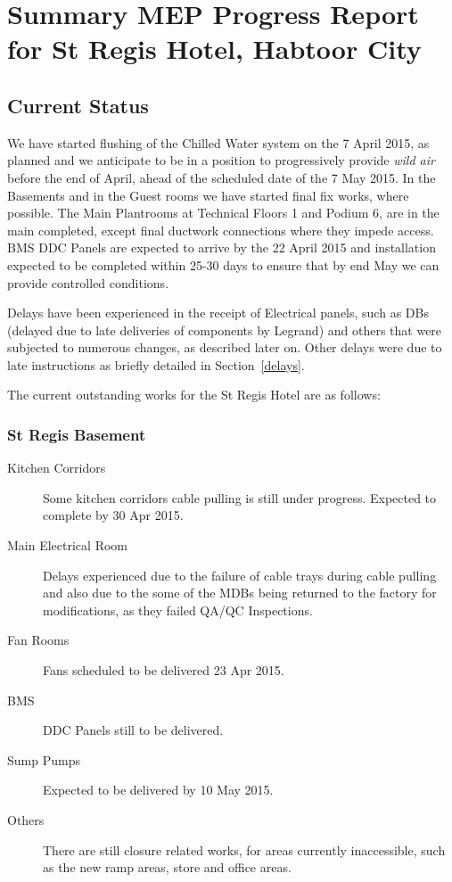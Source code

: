 %
\setcounter{page}{0}

\chapter{Summary MEP Progress Report for St Regis Hotel, Habtoor City}
\thispagestyle{plain}
\section{Current Status}

We have started flushing of the Chilled Water system on the 7 April 2015, as planned and we anticipate to be in a position to progressively provide \emph{wild air} before the end of April, ahead of the scheduled date of the 7 May 2015. In the Basements and in the Guest rooms we have started final fix works, where possible. The Main Plantrooms at Technical Floors 1 and Podium 6, are in the main completed, except final ductwork connections where they impede access. BMS DDC Panels are expected to arrive by the 22 April 2015 and installation expected to be completed within 25-30 days to ensure that by end May we can provide controlled conditions.

Delays have been experienced in the receipt of Electrical panels, such as DBs (delayed due to late deliveries of components by Legrand) and others that were subjected to numerous changes, as described later on.  Other delays were due to late instructions as briefly detailed in Section~\ref{delays}. 

The current outstanding works for the St Regis Hotel are as follows:

\subsection{St Regis Basement}

\begin{description}
\item[Kitchen Corridors] Some kitchen corridors cable pulling is still under progress. Expected to complete by 30 Apr 2015.
\item[Main Electrical Room] Delays experienced due to the failure of cable trays during cable pulling and also due to the some of the MDBs being returned to the factory for modifications, as they failed QA/QC Inspections.
\item[Fan Rooms] Fans scheduled to be delivered 23 Apr 2015.
\item[BMS] DDC Panels still to be delivered.
\item[Sump Pumps] Expected to be delivered by 10 May 2015. 
\item[Others] There are still closure related works, for areas currently inaccessible, such as the new ramp areas, store and office areas. 
\end{description}


